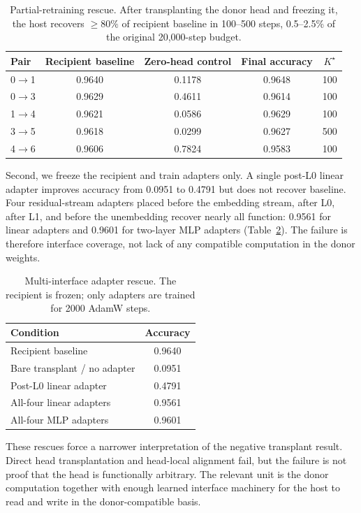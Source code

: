 \documentclass[final]{article}
\begin{document}
\begin{table}[h]
\centering
\caption{Partial-retraining rescue. After transplanting the donor head and
freezing it, the host recovers $\geq 80\%$ of recipient baseline in 100--500
steps, 0.5--2.5\% of the original 20,000-step budget.}
\label{tab:partial_retrain}
\begin{tabular}{lcccc}
\toprule
Pair & Recipient baseline & Zero-head control & Final accuracy & $K^\star$ \\
\midrule
0$\to$1 & 0.9640 & 0.1178 & 0.9648 & 100 \\
0$\to$3 & 0.9629 & 0.4611 & 0.9614 & 100 \\
1$\to$4 & 0.9621 & 0.0586 & 0.9629 & 100 \\
3$\to$5 & 0.9618 & 0.0299 & 0.9627 & 500 \\
4$\to$6 & 0.9606 & 0.7824 & 0.9583 & 100 \\
\bottomrule
\end{tabular}
\end{table}

Second, we freeze the recipient and train adapters only. A single post-L0
linear adapter improves accuracy from 0.0951 to 0.4791 but does not recover
baseline. Four residual-stream adapters placed before the embedding stream,
after L0, after L1, and before the unembedding recover nearly all function:
0.9561 for linear adapters and 0.9601 for two-layer MLP adapters
(Table~\ref{tab:stitching_adapters}). The failure is therefore interface
coverage, not lack of any compatible computation in the donor weights.

\begin{table}[h]
\centering
\caption{Multi-interface adapter rescue. The recipient is frozen; only adapters
are trained for 2000 AdamW steps.}
\label{tab:stitching_adapters}
\begin{tabular}{lc}
\toprule
Condition & Accuracy \\
\midrule
Recipient baseline & 0.9640 \\
Bare transplant / no adapter & 0.0951 \\
Post-L0 linear adapter & 0.4791 \\
All-four linear adapters & 0.9561 \\
All-four MLP adapters & 0.9601 \\
\bottomrule
\end{tabular}
\end{table}

These rescues force a narrower interpretation of the negative transplant
result. Direct head transplantation and head-local alignment fail, but the
failure is not proof that the head is functionally arbitrary. The relevant unit
is the donor computation together with enough learned interface machinery for
the host to read and write in the donor-compatible basis.
\end{document}
